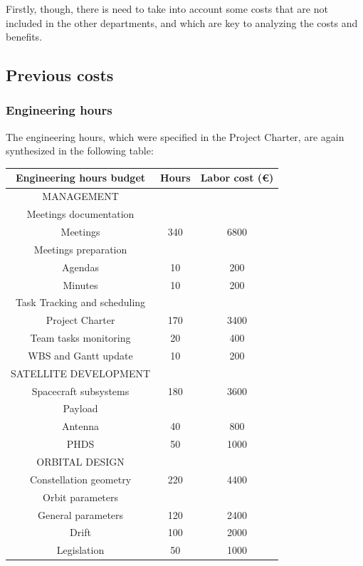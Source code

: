 Firstly, though, there is need to take into account some costs that are not included in the other departments, and which are key to analyzing the costs and benefits. 
\subsection{Previous costs}
\subsubsection{Engineering hours}
The engineering hours, which were specified in the Project Charter, are again synthesized in the following table:

\begin{longtable}{ccc}
\toprule
\rowcolor[gray]{0.65}
    \textbf{Engineering hours budget} & \textbf{Hours} & \textbf{Labor cost (\euro)} \\
    \midrule
    \endhead
\hline
\rowcolor[gray]{0.85}
	MANAGEMENT &  &  \\ \hline
	Meetings documentation &  &  \\ \hline
	Meetings & 340 & 6800 \\ \hline
	Meetings preparation &  &  \\ \hline
	Agendas & 10 & 200 \\ \hline
	Minutes & 10 & 200 \\ \hline
	Task Tracking and scheduling &  &  \\ \hline
	Project Charter & 170 & 3400 \\ \hline
	Team tasks monitoring & 20 & 400 \\ \hline
	WBS and Gantt update & 10 & 200 \\ \hline
	\rowcolor[gray]{0.85}
	SATELLITE DEVELOPMENT &  &  \\ \hline
	Spacecraft subsystems & 180 & 3600 \\ \hline
	Payload &  &  \\ \hline
	Antenna & 40 & 800 \\ \hline
	PHDS & 50 & 1000 \\ \hline
	\rowcolor[gray]{0.85}
	ORBITAL DESIGN &  &  \\ \hline
	Constellation geometry & 220 & 4400 \\ \hline
	Orbit parameters &  &  \\ \hline
	General parameters & 120 & 2400 \\ \hline
	Drift & 100 & 2000 \\ \hline
	Legislation & 50 & 1000 \\ \hline

\end{longtable}
